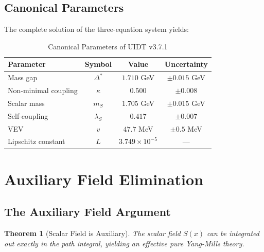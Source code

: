 \documentclass[11pt,a4paper]{article}
\theoremstyle{plain}
\newtheorem{theorem}{Theorem}[section]
\theoremstyle{definition}
\begin{document}
\subsection{Canonical Parameters}

The complete solution of the three-equation system yields:

\begin{table}[htbp]
\centering
\caption{Canonical Parameters of UIDT v3.7.1}
\label{tab:canonical}
\begin{tabular}{@{}lccc@{}}
\toprule
\textbf{Parameter} & \textbf{Symbol} & \textbf{Value} & \textbf{Uncertainty} \\
\midrule
Mass gap & $\Delta^*$ & $1.710$ GeV & $\pm 0.015$ GeV \\
Non-minimal coupling & $\kappa$ & $0.500$ & $\pm 0.008$ \\
Scalar mass & $m_S$ & $1.705$ GeV & $\pm 0.015$ GeV \\
Self-coupling & $\lambda_S$ & $0.417$ & $\pm 0.007$ \\
VEV & $v$ & $47.7$ MeV & $\pm 0.5$ MeV \\
Lipschitz constant & $L$ & $3.749 \times 10^{-5}$ & --- \\
\bottomrule
\end{tabular}
\end{table}

\newpage
\section{Auxiliary Field Elimination}
\label{sec:auxiliary}

\subsection{The Auxiliary Field Argument}

\begin{theorem}[Scalar Field is Auxiliary]
\label{thm:auxiliary}
The scalar field $S(x)$ can be integrated out exactly in the path integral, yielding an effective pure Yang-Mills theory.
\end{theorem}
\end{document}
